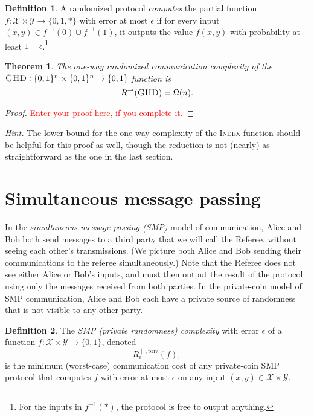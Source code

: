 \documentclass[11pt]{amsart}
\theoremstyle{plain}
\newtheorem{theorem}{Theorem}
\theoremstyle{definition}
\newtheorem{definition}{Definition}
\theoremstyle{plain}
\newcommand{\calX}{\mathcal{X}}
\newcommand{\calY}{\mathcal{Y}}
\newcommand{\GHD}{\textsc{GHD}}
\newcommand{\replacethistext}[1]{\textcolor{red}{#1}}
\begin{document}
\begin{definition}
A randomized protocol \emph{computes} the partial function $f : \calX \times \calY \to \{0,1,*\}$ with error at most $\epsilon$ if for every input $(x,y) \in f^{-1}(0) \cup f^{-1}(1)$, it outputs the value $f(x,y)$ with probability at least $1-\epsilon$.\footnote{For the inputs in $f^{-1}(*)$, the protocol is free to output anything.}
\end{definition}

\begin{theorem}
The one-way randomized communication complexity of the $\GHD : \{0,1\}^n \times \{0,1\}^n \to \{0,1\}$ function is
\[
R^\rightarrow(\GHD) = \Omega(n).
\]
\end{theorem}

\begin{proof}
\replacethistext{Enter your proof here, if you complete it.}
\end{proof}


\bigskip
\emph{Hint.} The lower bound for the one-way complexity of the \textsc{Index} function should be helpful for this proof as well, though the reduction is not (nearly) as straightforward as the one in the last section.


\newpage 
\section{Simultaneous message passing}

In the \emph{simultaneous message passing (SMP)} model of communication, Alice and Bob both send messages to a third party that we will call the Referee, without seeing each other's transmissions. (We picture both Alice and Bob sending their communications to the referee simultaneously.) Note that the Referee does not see either Alice or Bob's inputs, and must then output the result of the protocol using only the messages received from both parties. In the private-coin model of SMP communication, Alice and Bob each have a private source of randomness that is not visible to any other party.

\begin{definition}
The \emph{SMP (private randomness) complexity} with error $\epsilon$ of a function $f : \calX \times \calY \to \{0,1\}$, denoted
\[
R^{\parallel,\mathrm{priv}}_\epsilon(f),
\] 
is the minimum (worst-case) communication cost of any private-coin SMP protocol that computes $f$ with error at most $\epsilon$ on any input $(x,y) \in \calX \times \calY$.
\end{definition}
\end{document}
